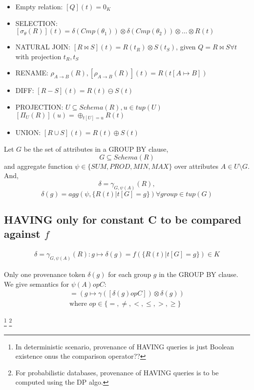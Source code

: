 \documentclass{article}
\begin{document}
\begin{itemize}
  \item Empty relation: $[Q](t) = 0_K$
  \item SELECTION: $[\sigma_{\theta}(R)](t) = \delta(Cmp(\theta_1)) \otimes \delta(Cmp(\theta_2))\otimes \dots \otimes R(t)$
  \item NATURAL JOIN: $[R \bowtie S](t) = R(t_R) \otimes S(t_S)$, given $Q = R \bowtie S \forall t$ with projection $t_R, t_S$
  \item RENAME: $\rho_{A\rightarrow B}(R), [\rho_{A\rightarrow B} (R)](t) = R(t[A \mapsto B])$
  \item DIFF: $[R - S](t) = R(t) \ominus S(t)$
  \item PROJECTION: $U \subseteq Schema(R), u\in tup(U)$\\
  $[\Pi_U(R)](u) = \oplus_{t[U] = u} R(t)$\\
  \item UNION: $[R \cup S](t) = R(t) \oplus S(t)$
\end{itemize}

Let $G$ be the set of attributes in a GROUP BY clause,
$$G \subseteq Schema(R)$$
and aggregate function $\psi\in\{SUM, PROD, MIN, MAX\}$ over attributes $A\in U\setminus G$.\\
And, $$\delta = \gamma_{G,\psi(A)}(R),$$
$$\delta(g) = agg(\psi, \{R(t) | t[G] = g\}) \forall group \in tup(G)$$

\subsection{HAVING only for constant C to be compared against $f$}
\begin{align*}
  \delta = \gamma_{G,\psi(A)}(R): g \mapsto \delta(g) = f(\{R(t)|t[G] = g\})\in K
\end{align*}

Only one provenance token $\delta(g)$ for each group $g$ in the GROUP BY clause.\\
We give semantics for $\psi(A) op C$:
\begin{align*}
  [\gamma_{G,\psi(A)}(R) \text{ HAVING } \psi(A) op C] = (g \mapsto \gamma ([\delta(g) op C])\otimes \delta(g))\\
  \text{where } op \in \{=, \neq, <, \leq, >, \geq\}
\end{align*}

\footnote{In deterministic scenario, provenance of HAVING queries is just Boolean existence onus the comparison operator??}
\footnote{For probabilistic databases, provenance of HAVING queries is to be computed using the DP algo.}


\end{document}

